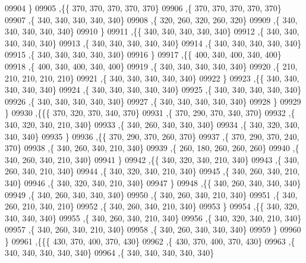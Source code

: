 \begin{DoxyCode}
09904     \}
09905    ,\{\{   370,   370,   370,   370,   370\}
09906     ,\{   370,   370,   370,   370,   370\}
09907     ,\{   340,   340,   340,   340,   340\}
09908     ,\{   320,   260,   320,   260,   320\}
09909     ,\{   340,   340,   340,   340,   340\}
09910     \}
09911    ,\{\{   340,   340,   340,   340,   340\}
09912     ,\{   340,   340,   340,   340,   340\}
09913     ,\{   340,   340,   340,   340,   340\}
09914     ,\{   340,   340,   340,   340,   340\}
09915     ,\{   340,   340,   340,   340,   340\}
09916     \}
09917    ,\{\{   400,   340,   400,   340,   400\}
09918     ,\{   400,   340,   400,   340,   400\}
09919     ,\{   340,   340,   340,   340,   340\}
09920     ,\{   210,   210,   210,   210,   210\}
09921     ,\{   340,   340,   340,   340,   340\}
09922     \}
09923    ,\{\{   340,   340,   340,   340,   340\}
09924     ,\{   340,   340,   340,   340,   340\}
09925     ,\{   340,   340,   340,   340,   340\}
09926     ,\{   340,   340,   340,   340,   340\}
09927     ,\{   340,   340,   340,   340,   340\}
09928     \}
09929    \}
09930   ,\{\{\{   370,   320,   370,   340,   370\}
09931     ,\{   370,   290,   370,   340,   370\}
09932     ,\{   340,   320,   340,   210,   340\}
09933     ,\{   340,   260,   340,   340,   340\}
09934     ,\{   340,   320,   340,   340,   340\}
09935     \}
09936    ,\{\{   370,   290,   370,   260,   370\}
09937     ,\{   370,   290,   370,   240,   370\}
09938     ,\{   340,   260,   340,   210,   340\}
09939     ,\{   260,   180,   260,   260,   260\}
09940     ,\{   340,   260,   340,   210,   340\}
09941     \}
09942    ,\{\{   340,   320,   340,   210,   340\}
09943     ,\{   340,   260,   340,   210,   340\}
09944     ,\{   340,   320,   340,   210,   340\}
09945     ,\{   340,   260,   340,   210,   340\}
09946     ,\{   340,   320,   340,   210,   340\}
09947     \}
09948    ,\{\{   340,   260,   340,   340,   340\}
09949     ,\{   340,   260,   340,   340,   340\}
09950     ,\{   340,   260,   340,   210,   340\}
09951     ,\{   340,   260,   210,   340,   210\}
09952     ,\{   340,   260,   340,   210,   340\}
09953     \}
09954    ,\{\{   340,   320,   340,   340,   340\}
09955     ,\{   340,   260,   340,   210,   340\}
09956     ,\{   340,   320,   340,   210,   340\}
09957     ,\{   340,   260,   340,   210,   340\}
09958     ,\{   340,   260,   340,   340,   340\}
09959     \}
09960    \}
09961   ,\{\{\{   430,   370,   400,   370,   430\}
09962     ,\{   430,   370,   400,   370,   430\}
09963     ,\{   340,   340,   340,   340,   340\}
09964     ,\{   340,   340,   340,   340,   340\}

\end{DoxyCode}

